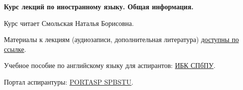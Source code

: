 \documentclass[main.tex]{subfiles}
\begin{document}
{\parindent0pt

\textbf{Курс лекций по иностранному языку. Общая информация.}

Курс читает Смольская Наталья Борисовна.

Материалы к лекциям (аудиозаписи, дополнительная литература) \href{https://drive.google.com/drive/folders/1iSx2EjJJ98rhPpOsM4xGcJA7-7qitQHM?usp=sharing}{доступны по ссылке}.

Учебное пособие по английскому языку для аспирантов: \href{https://elib.spbstu.ru/dl/2/s19-119.pdf/info}{ИБК СПбПУ}.

Портал аспирантуры: \href{https://portasp.spbstu.ru/login/index.php}{PORTASP SPBSTU}.

}
\end{document}
